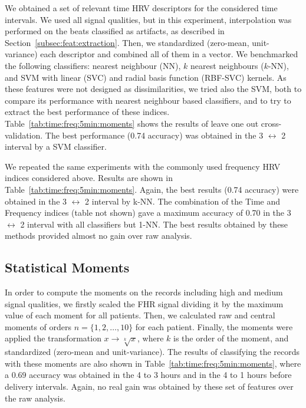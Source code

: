 We obtained a set of relevant time HRV descriptors for the considered time intervals. We used all signal qualities, but in this experiment, interpolation was performed on the beats classified as artifacts, as described in Section~\ref{subsec:feat:extraction}. Then, we standardized (zero-mean, unit-variance) each descriptor and combined all of them in a vector.  We benchmarked the following classifiers:  nearest neighbour (NN), $k$ nearest neighbours ($k$-NN), and SVM with linear (SVC) and radial basis function  (RBF-SVC)  kernels. As these features were not designed as dissimilarities, we tried also the SVM,  both to compare its performance with nearest neighbour based classifiers, and to try to extract the best performance of these indices. Table~\ref{tab:time:freq:5min:moments} shows the results of leave one out cross-validation.  The best performance  (0.74 accuracy) was obtained in the 3 $\leftrightarrow$  2 interval by a SVM classifier.


 We repeated the same experiments with the commonly used frequency HRV indices considered above. Results are shown in Table~\ref{tab:time:freq:5min:moments}.  Again, the best results (0.74 accuracy) were obtained in the  3 $\leftrightarrow$  2 interval by k-NN. The combination of the Time and Frequency indices (table not shown) gave a maximum accuracy of 0.70 in the 3 $\leftrightarrow$  2 interval with all classifiers but 1-NN. The best results obtained by these methods provided almost no gain over raw analysis.


\subsection{Statistical Moments}


In order to compute the moments on the records including high and medium signal qualities, we firstly scaled the FHR signal dividing it by the maximum value of each moment for all patients. Then, we calculated raw and central moments of orders $n=\{1,2,\ldots,10\}$ for each patient. Finally, the moments were applied the transformation $x \rightarrow \sqrt[k]{x}$, where $k$ is the order of the moment, and standardized (zero-mean and unit-variance). The results of classifying the records with these moments are also shown in Table~\ref{tab:time:freq:5min:moments}, where a $0.69$ accuracy was obtained in the 4 to 3 hours and in the 4 to 1 hours before delivery intervals. Again, no real gain was obtained by these set of features over the raw analysis.




